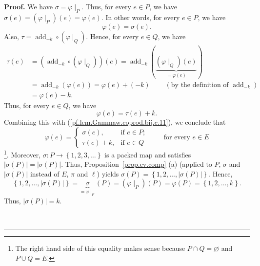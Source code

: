\documentclass[numbers=enddot,12pt,final,onecolumn,notitlepage,abstracton]{scrartcl}
\theoremstyle{definition}
\newenvironment{proof}[1][Proof]{\noindent\textbf{#1.} }{\ \rule{0.5em}{0.5em}}
\newenvironment{verlong}{}{}
\begin{document}
\begin{verlong}
\begin{proof}
We have $\sigma=\varphi\mid_{P}$. Thus, for every $e\in P$, we have
$\sigma\left(  e\right)  =\left(  \varphi\mid_{P}\right)  \left(  e\right)
=\varphi\left(  e\right)  $. In other words, for every $e\in P$, we have
\begin{equation}
\varphi\left(  e\right)  =\sigma\left(  e\right)  .
\label{pf.lem.Gammaw.coprod.bij.c.11}%
\end{equation}
Also, $\tau=\operatorname{add}_{-k}\circ\left(  \varphi\mid
_{Q}\right)  $. Hence, for every $e\in Q$, we have%
\begin{align*}
\tau\left(  e\right)   &  =\left(  \operatorname{add}_{-k}%
\circ\left(  \varphi\mid_{Q}\right)  \right)  \left(  e\right)
=\operatorname{add}_{-k}\left(  \underbrace{\left(  \varphi\mid
_{Q}\right)  \left(  e\right)  }_{=\varphi\left(  e\right)  }\right) \\
&  =\operatorname{add}_{-k}\left(  \varphi\left(  e\right)  \right)
=\varphi\left(  e\right)  +\left(  -k\right)  \ \ \ \ \ \ \ \ \ \ \left(
\text{by the definition of }\operatorname{add}_{-k}\right) \\
&  =\varphi\left(  e\right)  -k.
\end{align*}
Thus, for every $e\in Q$, we have%
\[
\varphi\left(  e\right)  =\tau\left(  e\right)  +k.
\]
Combining this with (\ref{pf.lem.Gammaw.coprod.bij.c.11}), we conclude that%
\begin{equation}
\varphi\left(  e\right)  =%
\begin{cases}
\sigma\left(  e\right)  , & \text{if }e\in P;\\
\tau\left(  e\right)  +k, & \text{if }e\in Q
\end{cases}
\ \ \ \ \ \ \ \ \ \ \text{for every }e\in E
\label{pf.lem.Gammaw.coprod.bij.c.12}%
\end{equation}
\footnote{The right hand side of this equality makes sense because $P\cap
Q=\varnothing$ and $P\cup Q=E$.}.
Moreover, $\sigma : P \to \left\{ 1, 2, 3, \ldots \right\}$ is a
packed map and satisfies
$\left\vert \sigma\left(  P\right)  \right\vert
= \left\vert \sigma\left(  P\right)  \right\vert$. Thus,
Proposition~\ref{prop.ev.comp} (a) (applied to $P$, $\sigma$ and
$\left\vert \sigma\left(  P\right)  \right\vert$ instead of $E$, $\pi$
and $\ell$) yields
$\sigma\left(  P\right)  =\left\{  1,2,\ldots,\left\vert \sigma\left(
P\right)  \right\vert \right\}  $. Hence,%
\[
\left\{  1,2,\ldots,\left\vert \sigma\left(  P\right)  \right\vert \right\}
=\underbrace{\sigma}_{=\varphi\mid_{P}}\left(  P\right)  =\left(  \varphi
\mid_{P}\right)  \left(  P\right)  =\varphi\left(  P\right)  =\left\{
1,2,\ldots,k\right\}  .
\]
Thus, $\left\vert \sigma\left(  P\right)  \right\vert =k$.


\end{proof}
\end{verlong}
\end{document}
